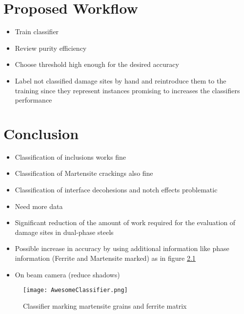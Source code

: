 \documentclass[10pt,a4paper]{report}
\begin{document}
\chapter{Proposed Workflow}
\begin{itemize}
\item Train classifier
\item Review purity efficiency
\item Choose threshold high enough for the desired accuracy
\item Label not classified damage sites by hand and reintroduce them to the training since they represent instances promising to increases the classifiers performance
\end{itemize}

\chapter{Conclusion}
\begin{itemize}
\item Classification of inclusions works fine
\item Classification of Martensite crackings also fine
\item Classification of interface decohesions and notch effects problematic
\item Need more data
\item Significant reduction of the amount of work required for the evaluation of damage sites in dual-phase steels
\item Possible increase in accuracy by using additional information like phase information (Ferrite and Martensite marked) as in figure \ref{fig:Phases}
\item On beam camera (reduce shadows)
\end{itemize}

\begin{figure}
\centering
  \texttt{[image: AwesomeClassifier.png]}
  \caption{Classifier marking martensite grains and ferrite matrix}
  \label{fig:Phases}
\end{figure}
\end{document}
